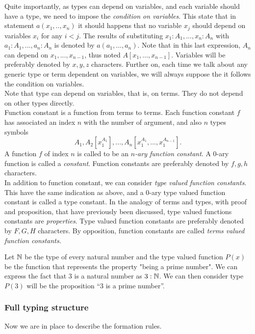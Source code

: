 Quite importantly, as types can depend on variables, and each variable should have a type, we need to impose the \emph{condition on variables}. This state that in statement $a(x_1,..,x_n)$ it should happens that no variable $x_j$ should depend on variables $x_i$ for any $i<j$. The results of substituting $x_1:A_1,...,x_n:A_n$ with $a_1:A_1,...,a_n:A_n$ is denoted by $a(a_1,...,a_n)$. Note that in this last expression, $A_n$ can depend on $x_1,...,x_{n-1}$, thus noted $A[x_1,...,x_{n-1}]$. Variables will be preferably denoted by $x,y,z$ characters. Further on, each time we talk about any generic type or term dependent on variables, we will always suppose the it follows the condition on variables.\\

Note that type can depend on variables, that is, on terms. They do not depend on other types directly.\\ 

Function constant is a function from terms to terms. Each function constant $f$ has associated an index $n$ with the number of argument, and also $n$ types symbols $$A_1, A_2[x_1^{A_1}],...,A_n[x_1^{A_1},...,x_1^{A_{n-1}}].$$ A function $f$ of index $n$ is called to be an \emph{$n$-ary function constant}. A 0-ary function is called a \emph{constant}.  Function constants are preferably denoted by $f,g,h$ characters. \\

In addition to function constant, we can consider \emph{type valued function constants}. This have the same indication as above, and a 0-ary type valued function constant is called a type constant. In the analogy of terms and types, with proof and proposition, that have previously been discussed, type valued functions constants are \emph{properties}. Type valued function constants are preferably denoted by $F,G,H$ characters. By opposition, function constants are called \emph{terms valued function constants}.


\begin{example}\label{example:primeML}
  Let $\mathbb{N}$ be the type of every natural number and the type valued function $P(x)$ be the function that represents the property "being a prime number". We can express the fact that 3 is a natural number as $3: \mathbb{N}$. We can then consider  type $P(3)$ will be the proposition ``3 is a prime number''. 
\end{example}

\subsubsection{Full typing structure}
Now we are in place to describe the formation rules.

